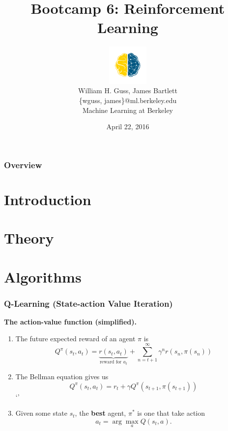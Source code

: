 \documentclass{beamer}
\title[Reinforcement Learning]{Bootcamp 6: Reinforcement Learning}
\author[Guss \& Bartlett]{\includegraphics[height=2cm,width=2cm]{BlueGold_fill_small.png}\\   William H. Guss, James Bartlett\\\{wguss, james\}@ml.berkeley.edu\\Machine Learning at Berkeley}
\date{April 22, 2016} %
\numberwithin{equation}{subsection}
\numberwithin{theorem}{subsection}
\begin{document}
  

\begin{frame}{}
\titlepage
\end{frame}



\begin{frame}

\frametitle{Overview}
\tableofcontents
\end{frame}


\section{Introduction}


\section{Theory}



\section{Algorithms}

\begin{frame}
\frametitle{Q-Learning (State-action Value Iteration)}
  \textbf{The action-value function (simplified).}
  \begin{enumerate}
    \item  The future expected reward of an agent $\pi$ is
    \begin{equation*}
      Q^\pi(s_t, a_t) = \underbrace{r(s_t, a_t)}_{\text{reward for } a_t} + \sum_{n={t+1}}^\infty \gamma^n r(s_n, \pi(s_n))
    \end{equation*}
    \item The Bellman equation gives us 
    \begin{equation*}
      Q^\pi(s_t, a_t) = r_t + \gamma Q^\pi(s_{t+1}, \pi(s_{t+1}))
    \end{equation*}`'
    \item Given some state $s_t$, the \textbf{best} agent, $\pi^*$ is one that take action 
    \begin{equation*}
      a_t = \arg \max_a Q(s_t, a).   
    \end{equation*}
  \end{enumerate}
\end{frame}
\end{document}
